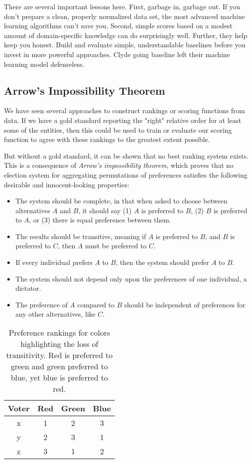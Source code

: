 \documentclass[10pt]{article}
\begin{document}
There are several important lessons here. First, garbage in, garbage out. If you don't prepare a clean, properly normalized data set, the most advanced machine learning algorithms can't save you. Second, simple scores based on a modest amount of domain-specific knowledge can do surprisingly well. Further, they help keep you honest. Build and evaluate simple, understandable baselines before you invest in more powerful approaches. Clyde going baseline left their machine learning model defenseless.

\subsection{Arrow's Impossibility Theorem}
We have seen several approaches to construct rankings or scoring functions from data. If we have a gold standard reporting the "right" relative order for at least some of the entities, then this could be used to train or evaluate our scoring function to agree with these rankings to the greatest extent possible.

But without a gold standard, it can be shown that no best ranking system exists. This is a consequence of \emph{Arrow's impossibility theorem}, which proves that no election system for aggregating permutations of preferences satisfies the following desirable and innocent-looking properties:

\begin{itemize}
  \item The system should be complete, in that when asked to choose between alternatives $A$ and $B$, it should say (1) $A$ is preferred to $B$, (2) $B$ is preferred to $A$, or (3) there is equal preference between them.
  \item The results should be transitive, meaning if $A$ is preferred to $B$, and $B$ is preferred to $C$, then $A$ must be preferred to $C$.
  \item If every individual prefers $A$ to $B$, then the system should prefer $A$ to $B$.
  \item The system should not depend only upon the preferences of one individual, a dictator.
  \item The preference of $A$ compared to $B$ should be independent of preferences for any other alternatives, like $C$.
\end{itemize}

\begin{table}[ht]
\centering
\begin{tabular}{c|ccc}
Voter & Red & Green & Blue \\
\hline
x & 1 & 2 & 3 \\
y & 2 & 3 & 1 \\
z & 3 & 1 & 2 \\
\end{tabular}
\caption{Preference rankings for colors highlighting the loss of transitivity. Red is preferred to green and green preferred to blue, yet blue is preferred to red.}
\end{table}
\end{document}
